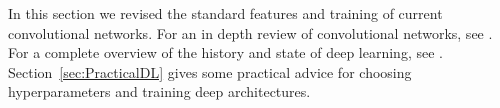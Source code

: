 In this section we revised the standard features and training of current convolutional networks. For an in depth review of convolutional networks, see \cite{Karpathy2015}. For a complete overview of the history and state of deep learning, see \cite{Schmidhuber2015}. Section~\ref{sec:PracticalDL} gives some practical advice for choosing hyperparameters and training deep architectures. 
